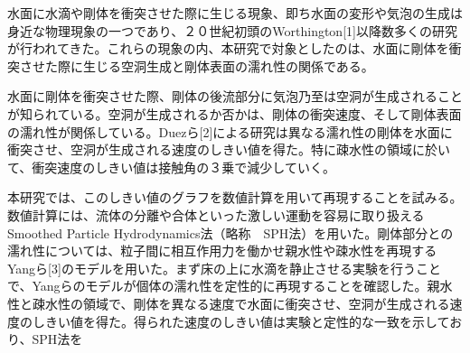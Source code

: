 \documentclass[a4paper]{jsarticle}
\begin{document}
{\fontsize{10.5pt}{14pt}\selectfont 

 水面に水滴や剛体を衝突させた際に生じる現象、即ち水面の変形や気泡の生成は身近な物理現象の一つであり、２０世紀初頭のWorthington[1]以降数多くの研究が行われてきた。これらの現象の内、本研究で対象としたのは、水面に剛体を衝突させた際に生じる空洞生成と剛体表面の濡れ性の関係である。

 水面に剛体を衝突させた際、剛体の後流部分に気泡乃至は空洞が生成されることが知られている。空洞が生成されるか否かは、剛体の衝突速度、そして剛体表面の濡れ性が関係している。Duezら[2]による研究は異なる濡れ性の剛体を水面に衝突させ、空洞が生成される速度のしきい値を得た。特に疎水性の領域に於いて、衝突速度のしきい値は接触角の３乗で減少していく。

 本研究では、このしきい値のグラフを数値計算を用いて再現することを試みる。数値計算には、流体の分離や合体といった激しい運動を容易に取り扱えるSmoothed Particle Hydrodynamics法（略称　SPH法）を用いた。剛体部分との濡れ性については、粒子間に相互作用力を働かせ親水性や疎水性を再現するYangら[3]のモデルを用いた。まず床の上に水滴を静止させる実験を行うことで、Yangらのモデルが個体の濡れ性を定性的に再現することを確認した。親水性と疎水性の領域で、剛体を異なる速度で水面に衝突させ、空洞が生成される速度のしきい値を得た。得られた速度のしきい値は実験と定性的な一致を示しており、SPH法を




}
\end{document}
